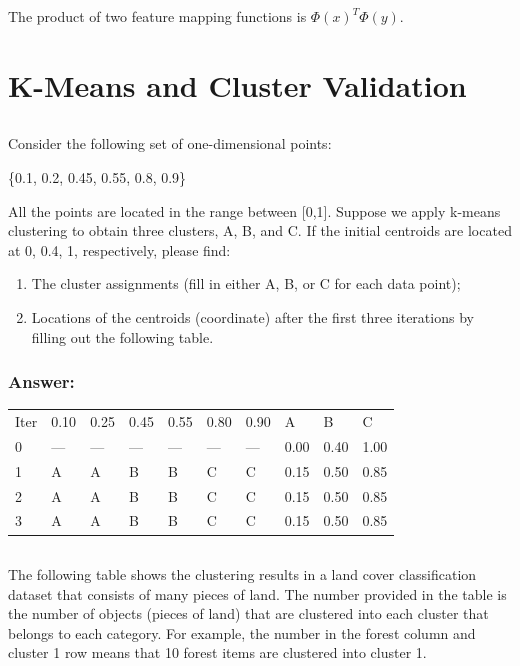 \documentclass{article}
\begin{document}
The product of two feature mapping functions is $\Phi {(x)}^T \Phi (y)$.


\section{K-Means and Cluster Validation}

\subsection{}

Consider the following set of one-dimensional points:
\begin{center}
    \{0.1, 0.2, 0.45, 0.55, 0.8, 0.9\}
\end{center}

All the points are located in the range between [0,1]. Suppose we apply k-means clustering to obtain three clusters, A, B, and C. If the initial centroids are located at {0, 0.4, 1}, respectively, please find:

\begin{enumerate}[label= (\alph*)]
    \item The cluster assignments (fill in either A, B, or C for each data point);
    \item Locations of the centroids (coordinate) after the first three iterations by filling out the following table.
\end{enumerate}

\subsubsection*{Answer:}

\begin{table}[ht]
    \centering
    \begin{tabular}{llllllllll}
    Iter & 0.10 & 0.25 & 0.45 & 0.55 & 0.80 & 0.90 & A & B & C \\
    0 & --- & --- & --- & --- & --- & --- & 0.00 & 0.40 & 1.00 \\
    1 & A  & A & B & B & C & C & 0.15 & 0.50 & 0.85 \\
    2 & A  & A & B & B & C & C & 0.15 & 0.50 & 0.85\\
    3 & A  & A & B & B & C & C & 0.15 & 0.50 & 0.85 
    \end{tabular}
\end{table}

\subsection{}
The following table shows the clustering results in a land cover classification dataset that consists of many pieces of land. The number provided in the table is the number of objects (pieces of land) that are clustered into each cluster that belongs to each category. For example, the number in the forest column and cluster 1 row means that 10 forest items are clustered into cluster 1.
\end{document}
